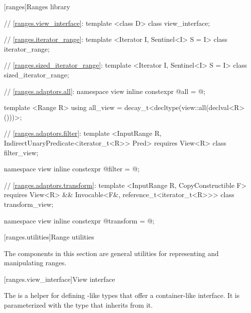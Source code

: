 
\setcounter{chapter}{9}
[ranges]{Ranges library}


\begin{codeblock}
// \ref{ranges.view_interface}:
template <class D>
class view_interface;

// \ref{ranges.iterator_range}:
template <Iterator I, Sentinel<I> S = I>
class iterator_range;

// \ref{ranges.sized_iterator_range}:
template <Iterator I, Sentinel<I> S = I>
class sized_iterator_range;

// \ref{ranges.adaptors.all}:
namespace view { inline constexpr @\unspec@ all = @\unspec@; }

template <Range R>
using all_view = decay_t<decltype(view::all(declval<R>()))>;

// \ref{ranges.adaptors.filter}:
template <InputRange R, IndirectUnaryPredicate<iterator_t<R>> Pred>
  requires View<R>
class filter_view;

namespace view { inline constexpr @\unspec@ filter = @\unspec@; }

// \ref{ranges.adaptors.transform}:
template <InputRange R, CopyConstructible F>
  requires View<R> && Invocable<F&, reference_t<iterator_t<R>>>
class transform_view;

namespace view { inline constexpr @\unspec@ transform = @\unspec@; }
\end{codeblock}


\setcounter{section}{6}
[ranges.utilities]{Range utilities}

\pnum
The components in this section are general utilities for representing and manipulating
ranges.

[ranges.view_interface]{View interface}

\pnum
The  is a helper for defining -like types that offer a
container-like interface. It is parameterized with the type that inherits from it.

